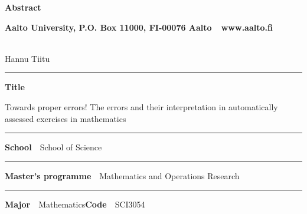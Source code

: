 
  \newpage


  \begin{spacing}{.88}

  {\parindent0pt %

  {\fontsize{13.9pt}{13.9pt}\selectfont
  \vspace{-8.9mm}\hfill{\bfseries\sffamily\lsstyle Abstract}}

  {\fontsize{9.48pt}{9.48pt}\selectfont
  \vspace{.9mm}\hfill{\bfseries\sffamily\lsstyle Aalto University, P.O. Box 11000, FI-00076 Aalto~~\textcolor{aaltoGray}{www.aalto.fi}}}

  \\
  {\small Hannu Tiitu}

  \vspace{-2.4mm}\rule{\textwidth}{.75pt}

  {\fontsize{10.5pt}{10.5pt}\bfseries\sffamily\lsstyle Title}\\
  \parbox[t]{\textwidth}{\raggedright\small Towards proper errors! The errors and their interpretation in automatically assessed exercises in mathematics}

  \vspace{.5mm}\rule{\textwidth}{.75pt}

  {\fontsize{10.5pt}{10.5pt}\bfseries\sffamily\lsstyle School}~~{\small School of Science}

  \vspace{-2.4mm}\rule{\textwidth}{.75pt}

  {\fontsize{10.5pt}{10.5pt}\bfseries\sffamily\lsstyle Master's programme}~~{\small Mathematics and Operations Research}

  \vspace{-2.4mm}\rule{\textwidth}{.75pt}

  {\fontsize{10.5pt}{10.5pt}\bfseries\sffamily\lsstyle Major}~~{\small Mathematics}\hfill{\fontsize{10.5pt}{10.5pt}\bfseries\sffamily\lsstyle Code}~~{\small SCI3054}

}
\end{spacing}
